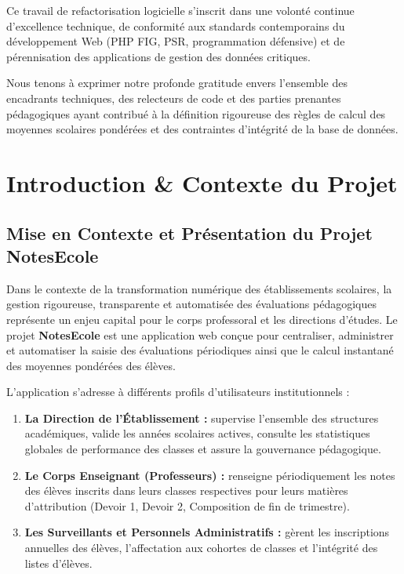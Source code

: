 \documentclass[11pt,a4paper,oneside]{report}
\begin{document}
Ce travail de refactorisation logicielle s'inscrit dans une volonté continue d'excellence technique, de conformité aux standards contemporains du développement Web (PHP FIG, PSR, programmation défensive) et de pérennisation des applications de gestion des données critiques.

Nous tenons à exprimer notre profonde gratitude envers l'ensemble des encadrants techniques, des relecteurs de code et des parties prenantes pédagogiques ayant contribué à la définition rigoureuse des règles de calcul des moyennes scolaires pondérées et des contraintes d'intégrité de la base de données.

\tableofcontents
\newpage
\listoffigures
\newpage
\listoftables
\newpage
\lstlistoflistings
\newpage

\setcounter{page}{1}

\chapter{Introduction \& Contexte du Projet}
\label{chap:introduction}

\section{Mise en Contexte et Présentation du Projet NotesEcole}

Dans le contexte de la transformation numérique des établissements scolaires, la gestion rigoureuse, transparente et automatisée des évaluations pédagogiques représente un enjeu capital pour le corps professoral et les directions d'études. Le projet \textbf{NotesEcole} est une application web conçue pour centraliser, administrer et automatiser la saisie des évaluations périodiques ainsi que le calcul instantané des moyennes pondérées des élèves.

L'application s'adresse à différents profils d'utilisateurs institutionnels :
\begin{enumerate}
    \item \textbf{La Direction de l'Établissement :} supervise l'ensemble des structures académiques, valide les années scolaires actives, consulte les statistiques globales de performance des classes et assure la gouvernance pédagogique.
    \item \textbf{Le Corps Enseignant (Professeurs) :} renseigne périodiquement les notes des élèves inscrits dans leurs classes respectives pour leurs matières d'attribution (Devoir 1, Devoir 2, Composition de fin de trimestre).
    \item \textbf{Les Surveillants et Personnels Administratifs :} gèrent les inscriptions annuelles des élèves, l'affectation aux cohortes de classes et l'intégrité des listes d'élèves.
\end{enumerate}
\end{document}
